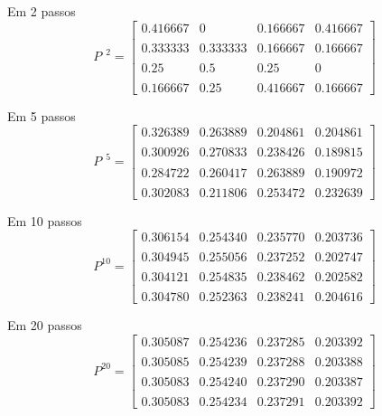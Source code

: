 \documentclass{beamer}
\begin{document}

\begin{frame}{Em 2 passos}
  \[
    P^{\phantom{0}2} =
    \begin{bmatrix}
      0.416667 & 0       & 0.166667 & 0.416667 \\\\
      0.333333 & 0.333333 & 0.166667 & 0.166667 \\\\
      0.25     & 0.5     & 0.25     & 0        \\\\
      0.166667 & 0.25    & 0.416667 & 0.166667
    \end{bmatrix}
  \]
\end{frame}
\begin{frame}{Em 5 passos}
  \[
    P^{\phantom{0}5} =
    \begin{bmatrix}
      0.326389 & 0.263889 & 0.204861 & 0.204861 \\\\
      0.300926 & 0.270833 & 0.238426 & 0.189815 \\\\
      0.284722 & 0.260417 & 0.263889 & 0.190972 \\\\
      0.302083 & 0.211806 & 0.253472 & 0.232639
    \end{bmatrix}
\]
\end{frame}
\begin{frame}{Em 10 passos}
  \[
    P^{10} =
    \begin{bmatrix}
      0.306154 & 0.254340 & 0.235770 & 0.203736 \\\\
      0.304945 & 0.255056 & 0.237252 & 0.202747 \\\\
      0.304121 & 0.254835 & 0.238462 & 0.202582 \\\\
      0.304780 & 0.252363 & 0.238241 & 0.204616
    \end{bmatrix}
  \]
\end{frame}
\begin{frame}{Em 20 passos}
  \[
    P^{20} =
    \begin{bmatrix}
      0.305087 & 0.254236 & 0.237285 & 0.203392 \\\\
      0.305085 & 0.254239 & 0.237288 & 0.203388 \\\\
      0.305083 & 0.254240 & 0.237290 & 0.203387 \\\\
      0.305083 & 0.254234 & 0.237291 & 0.203392
    \end{bmatrix}
  \]
\end{frame}
\end{document}
